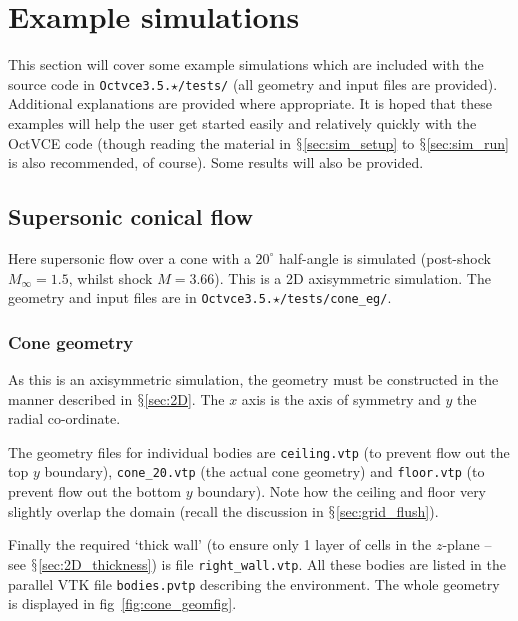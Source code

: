 \documentclass[pdftex, 12pt, a4paper]{report}
\begin{document}
\chapter{Example simulations}\label{sec:sim_eg}

This section will cover some example simulations which are included with the source code in
\verb'Octvce3.5.'$\star$\verb'/tests/' (all geometry and input files are provided).  Additional explanations are provided
where appropriate.  It is hoped that these examples will help the user get started easily and relatively quickly
with the OctVCE code (though reading the material in $\mathsection$\ref{sec:sim_setup} to $\mathsection$\ref{sec:sim_run} is also
recommended, of course).  Some results will also be provided.

\section{Supersonic conical flow}\label{sec:cone_eg}

Here supersonic flow over a cone with a $20^{\circ}$ half-angle is simulated (post-shock $M_{\infty} = 1.5$, whilst shock $M = 3.66$).
This is a 2D axisymmetric simulation.  The geometry and input files are in \verb'Octvce3.5.'$\star$\verb'/tests/cone_eg/'.

\subsection{Cone geometry}\label{sec:cone_geom}

As this is an axisymmetric simulation, the geometry must be constructed in the manner described in $\mathsection$\ref{sec:2D}.
The $x$ axis is the axis of symmetry and $y$ the radial co-ordinate.

The geometry files for individual bodies are \verb'ceiling.vtp' (to prevent flow out the top $y$ 
boundary), \verb'cone_20.vtp' (the actual cone geometry) and \verb'floor.vtp' 
(to prevent flow out the bottom $y$ boundary).  Note how the ceiling and floor very slightly overlap the domain (recall
the discussion in $\mathsection$\ref{sec:grid_flush}). 

Finally the required `thick wall' (to ensure only 1 layer of cells in the $z$-plane -- see $\mathsection$\ref{sec:2D_thickness}) 
is file \verb'right_wall.vtp'.  All these bodies are listed in the parallel VTK
file \verb'bodies.pvtp' describing the environment.  The whole geometry is displayed in fig~\ref{fig:cone_geomfig}.
\end{document}
